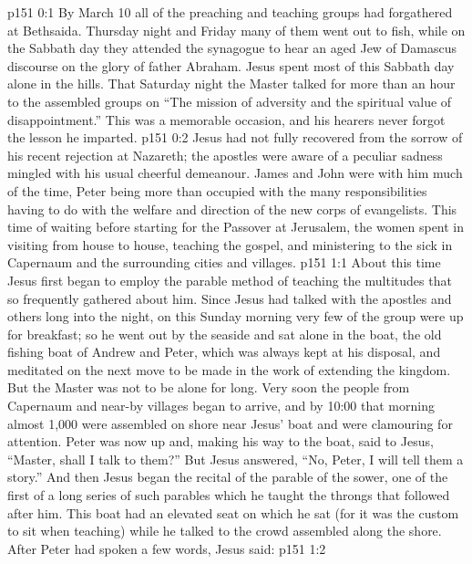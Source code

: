 \author{Midwayer Commission}
\vs p151 0:1 By March 10 all of the preaching and teaching groups had forgathered at Bethsaida. Thursday night and Friday many of them went out to fish, while on the Sabbath day they attended the synagogue to hear an aged Jew of Damascus discourse on the glory of father Abraham. Jesus spent most of this Sabbath day alone in the hills. That Saturday night the Master talked for more than an hour to the assembled groups on “The mission of adversity and the spiritual value of disappointment.” This was a memorable occasion, and his hearers never forgot the lesson he imparted.
\vs p151 0:2 Jesus had not fully recovered from the sorrow of his recent rejection at Nazareth; the apostles were aware of a peculiar sadness mingled with his usual cheerful demeanour. James and John were with him much of the time, Peter being more than occupied with the many responsibilities having to do with the welfare and direction of the new corps of evangelists. This time of waiting before starting for the Passover at Jerusalem, the women spent in visiting from house to house, teaching the gospel, and ministering to the sick in Capernaum and the surrounding cities and villages.
\vs p151 1:1 About this time Jesus first began to employ the parable method of teaching the multitudes that so frequently gathered about him. Since Jesus had talked with the apostles and others long into the night, on this Sunday morning very few of the group were up for breakfast; so he went out by the seaside and sat alone in the boat, the old fishing boat of Andrew and Peter, which was always kept at his disposal, and meditated on the next move to be made in the work of extending the kingdom. But the Master was not to be alone for long. Very soon the people from Capernaum and near\hyp{}by villages began to arrive, and by 10:00 that morning almost 1,000 were assembled on shore near Jesus’ boat and were clamouring for attention. Peter was now up and, making his way to the boat, said to Jesus, “Master, shall I talk to them?” But Jesus answered, “No, Peter, I will tell them a story.” And then Jesus began the recital of the parable of the sower, one of the first of a long series of such parables which he taught the throngs that followed after him. This boat had an elevated seat on which he sat (for it was the custom to sit when teaching) while he talked to the crowd assembled along the shore. After Peter had spoken a few words, Jesus said:
\vs p151 1:2 \pc {}
